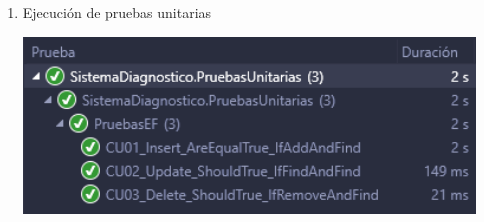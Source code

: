 \documentclass[preprint,12pt]{elsarticle}
\begin{document}
\begin{enumerate}
\item Ejecución de pruebas unitarias

\begin{center}
	\includegraphics[width=12cm]{./imagen/Screenshot_2.png}
\end{center}

\end{enumerate}
\end{document}
